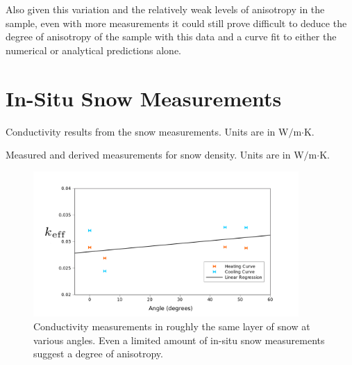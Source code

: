 Also given this variation and the relatively weak levels of anisotropy in the
sample, even with more measurements it could still prove difficult to deduce
the degree of anisotropy of the sample with this data and a curve fit to either
the numerical or analytical predictions alone.

\section{In-Situ Snow Measurements}

\begin{table}[h]
\centering
\caption{Conductivity results from the snow measurements. Units are in W\(/\)m\(\cdot\)K.}

\label{tab:snow}
\end{table}

\begin{table}[h]
\centering
\caption{Measured and derived measurements for snow density. Units are in W\(/\)m\(\cdot\)K.}

\label{tab:density}
\end{table}

\begin{figure}[h]
\centering
\includegraphics[width=0.9\textwidth]{fig/snow_meas.png}
\caption{Conductivity measurements in roughly the same layer of snow at various 
angles. Even a limited amount of in-situ snow measurements suggest a degree of
anisotropy.}
\label{fig:snow_results}
\end{figure}

